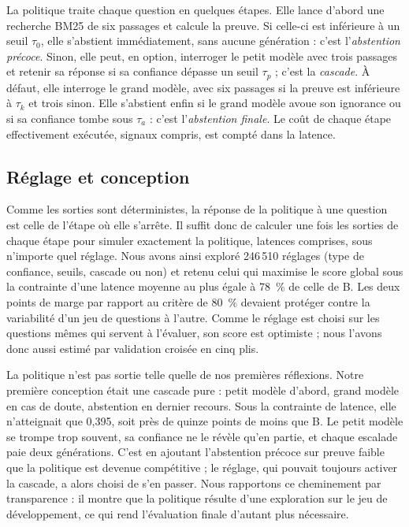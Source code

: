 \documentclass[11pt,a4paper]{article}
\begin{document}
La politique traite chaque question en quelques étapes. Elle lance d'abord une recherche BM25 de six
passages et calcule la preuve. Si celle-ci est inférieure à un seuil $\tau_0$, elle s'abstient
immédiatement, sans aucune génération : c'est l'\emph{abstention précoce}. Sinon, elle peut, en
option, interroger le petit modèle avec trois passages et retenir sa réponse si sa confiance dépasse un
seuil $\tau_p$ ; c'est la \emph{cascade}. À défaut, elle interroge le grand modèle, avec six passages si
la preuve est inférieure à $\tau_k$ et trois sinon. Elle s'abstient enfin si le grand modèle avoue son
ignorance ou si sa confiance tombe sous $\tau_a$ : c'est l'\emph{abstention finale}. Le coût de chaque
étape effectivement exécutée, signaux compris, est compté dans la latence.

\subsection{Réglage et conception}

Comme les sorties sont déterministes, la réponse de la politique à une question est celle de l'étape où
elle s'arrête. Il suffit donc de calculer une fois les sorties de chaque étape pour simuler exactement
la politique, latences comprises, sous n'importe quel réglage. Nous avons ainsi exploré 246\,510
réglages (type de confiance, seuils, cascade ou non) et retenu celui qui maximise le score global sous
la contrainte d'une latence moyenne au plus égale à 78~\% de celle de B. Les deux points de marge par
rapport au critère de 80~\% devaient protéger contre la variabilité d'un jeu de questions à l'autre.
Comme le réglage est choisi sur les questions mêmes qui servent à l'évaluer, son score est optimiste ;
nous l'avons donc aussi estimé par validation croisée en cinq plis.

La politique n'est pas sortie telle quelle de nos premières réflexions. Notre première conception était
une cascade pure : petit modèle d'abord, grand modèle en cas de doute, abstention en dernier recours.
Sous la contrainte de latence, elle n'atteignait que 0,395, soit près de quinze points de moins que B.
Le petit modèle se trompe trop souvent, sa confiance ne le révèle qu'en partie, et chaque escalade paie
deux générations. C'est en ajoutant l'abstention précoce sur preuve faible que la politique est devenue
compétitive ; le réglage, qui pouvait toujours activer la cascade, a alors choisi de s'en passer. Nous
rapportons ce cheminement par transparence : il montre que la politique résulte d'une exploration sur le
jeu de développement, ce qui rend l'évaluation finale d'autant plus nécessaire.
\end{document}
